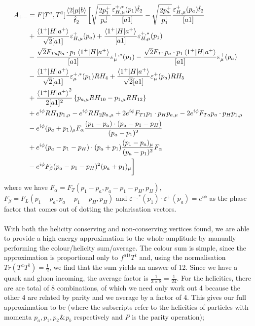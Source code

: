 \begin{equation}
\begin{split}
A_{+-} &=F[T^a,T^1]\frac{\mathinner{\langle2\vert\mu\vert b\rangle}_{}}{\hat{t}_2} \bigg[\sqrt{\frac{2p_1^+}{p_a^+}}\frac{\varepsilon_{H,\mu}^{+,*}(p_1) \hat{t}_2}{[a1]} - \sqrt{\frac{2p_a^+}{p_1^+}}\frac{\varepsilon_{H,\mu}^{+}(p_a)\hat{t}_2}{[a1]} \\
&+ \frac{\mathinner{\langle1^+\vert H\vert a^+\rangle}_{}}{\sqrt{2}[a1]}\varepsilon_{H,\mu}^+(p_a) + \frac{\mathinner{\langle1^+\vert H\vert a^+\rangle}_{}}{[a 1]}\varepsilon^{+,*}_{H,\mu}(p_1) \\
&- \frac{\sqrt{2} F_{Ta} p_a \cdot p_1 \mathinner{\langle1^+\vert H\vert a^+\rangle}_{}}{[a1]}\varepsilon^{+,*}_\mu (p_1) - \frac{\sqrt{2} F_{T1} p_a \cdot p_1 \mathinner{\langle1^+\vert H\vert a^+\rangle}_{}}{[a1]}\varepsilon^+_\mu (p_a)  \\ 
& -\frac{\mathinner{\langle1^+\vert H\vert a^+\rangle}_{}}{\sqrt{2} [a1]} \varepsilon^{+,*}_\mu(p_1) R H_4 + \frac{\mathinner{\langle1^+\vert H\vert a^+\rangle}_{}}{\sqrt{2} [a1]} \varepsilon^{+}_\mu(p_a)R H_5 \\
 &+ \frac{\mathinner{\langle1^+\vert H\vert a^+\rangle}_{}^2}{2 [a 1]^2}\left \{ p_{a,\mu} R H_{10} - p_{1,\mu}RH_{12}\right \} \\
 &+ e^{i \phi} R H_1 p_{1,\mu} - e^{i \phi} R H_2 p_{a,\mu} + 2 e^{i \phi} F_{T1} p_1\cdot p_H p_{a,\mu} - 2 e^{i \phi}F_{Ta} p_a \cdot p_H p_{1,\mu} \\
 &- e^{i \phi} (p_a + p_1)_\mu F_{\alpha} \frac{(p_1-p_a)\cdot(p_a-p_1-p_H)}{(p_a-p_1)^2} \\
 &+ e^{i \phi} (p_a - p_1 - p_H) \cdot (p_a + p_1) \frac{(p_1-p_a)_\mu}{(p_a-p_1)^2} F_\alpha \\
 &- e^{i \phi} F_\beta (p_a-p_1-p_H)^2 (p_a + p_1)_\mu 
  \bigg]
\end{split}
\end{equation}

where we have $F_\alpha = F_T(p_1-p_a,p_a-p_1-p_H,p_H)$, $F_\beta = F_L(p_1-p_a,p_a-p_1-p_H,p_H)$ and $\varepsilon^{-,*}(p_1) \cdot \varepsilon^+(p_a) = e^{i \phi}$ as the phase factor that comes out of dotting the polarisation vectors. \\
\\
With both the helicity conserving and non-conserving vertices found, we are able to provide a high energy approximation to the whole amplitude by manually performing the colour/helicity sum/average. The colour sum is simple, since the approximation is proportional only to $f^{a1t} T^t$ and, using the normalisation $Tr(T^a T^b) = \frac{1}{2}$, we find that the sum yields an answer of 12. Since we have a quark and gluon incoming, the average factor is $\frac{1}{3 \times 8} = \frac{1}{24}$. For the helicities, there are are total of 8 combinations, of which we need only work out 4 because the other 4 are related by parity and we average by a factor of 4.  This gives our full approximation to be (where the subscripts refer to the helicities of particles with momenta $p_a,p_1,p_2 \hspace{1pt} \& \hspace{1pt} p_b$ respectively and $P$ is the parity operation);

